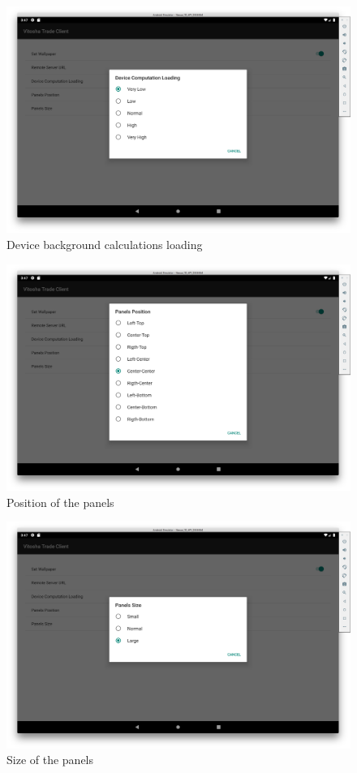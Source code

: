 \documentclass[a4paper,conference]{IEEEtran}
\begin{document}
\begin{figure}[htbp]
\centerline{\includegraphics[width=1.0\linewidth]{fig04.png}}
\caption{Device background calculations loading}
\label{fig04}
\end{figure}

\begin{figure}[htbp]
\centerline{\includegraphics[width=1.0\linewidth]{fig05.png}}
\caption{Position of the panels}
\label{fig05}
\end{figure}

\begin{figure}[htbp]
\centerline{\includegraphics[width=1.0\linewidth]{fig06.png}}
\caption{Size of the panels}
\label{fig06}
\end{figure}
\end{document}
